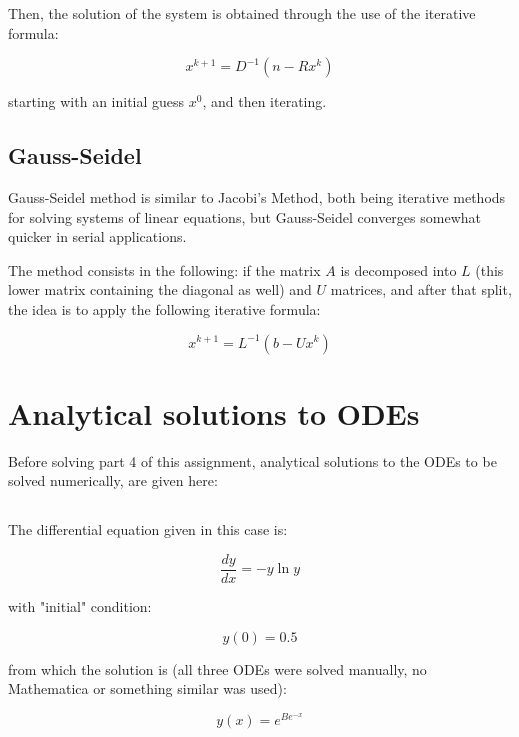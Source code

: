 \documentclass[paper=a4, fontsize=11pt]{scrartcl} %
\numberwithin{equation}{section} %
\numberwithin{figure}{section} %
\numberwithin{table}{section} %
\begin{document}
Then, the solution of the system is obtained through the use of the iterative formula:

\begin{equation}
x^{k+1} = D^{-1}(n-Rx^{k})
\end{equation}

starting with an initial guess $x^{0}$, and then iterating.

\subsection{Gauss-Seidel}

Gauss-Seidel method is similar to Jacobi's Method, both being iterative methods for solving systems of linear equations, but Gauss-Seidel converges somewhat quicker in serial applications.

The method consists in the following: if the matrix $A$ is decomposed into $L$ (this lower matrix containing the diagonal as well) and $U$ matrices, and after that split, the idea is to apply the following iterative formula:

\begin{equation}
x^{k+1} = L^{-1}(b-Ux^{k})
\end{equation}


\section{Analytical solutions to ODEs}

Before solving part 4 of this assignment, analytical solutions to the ODEs to be solved numerically, are given here:

\subsection{}

The differential equation given in this case is:

\begin{equation}
\frac{dy}{dx} = -y\ln y
\end{equation}

with "initial" condition:

\begin{equation}
y(0) = 0.5
\end{equation}

from which the solution is (all three ODEs were solved manually, no Mathematica or something similar was used):

\begin{equation}
y(x) = e^{Be^{-x}}
\end{equation}
\end{document}
